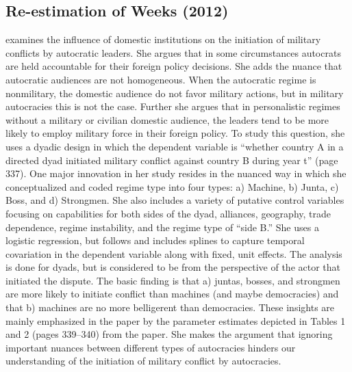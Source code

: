 \subsection{Re-estimation of Weeks (2012)}

\citet{weeks:2012} examines the influence of domestic institutions on the initiation of military conflicts by autocratic leaders.  She argues that in some circumstances autocrats are held accountable for their foreign policy decisions. She adds the nuance that autocratic audiences are not homogeneous. When the autocratic regime is nonmilitary, the domestic audience do not favor military actions, but in military autocracies this is not the case. Further she argues that in personalistic regimes without a military or civilian domestic audience, the leaders tend to be more likely to employ military force in their foreign policy.  To study this question, she uses a dyadic design in which the dependent variable is ``whether country A in a directed dyad initiated military conflict against country B during year t'' (page 337).  One major innovation in her study resides in the nuanced way in which she conceptualized and coded regime type into four types: a) Machine, b) Junta, c) Boss, and d) Strongmen. She also includes a variety of putative control variables focusing on capabilities for both sides of the dyad, alliances, geography, trade dependence, regime instability, and the regime type of ``side B.''  She uses a logistic regression, but follows \citet{beck:etal:1998} and includes splines to capture temporal covariation in the dependent variable along with fixed, unit effects. The analysis is done for dyads, but is considered to be from the perspective of the actor that initiated the dispute. The basic finding is that a) juntas, bosses, and strongmen are more likely to initiate conflict than machines (and maybe democracies) and that b) machines are no more belligerent than democracies.  These insights are mainly emphasized in the paper by the parameter estimates depicted in Tables 1 and 2 (pages 339--340) from the paper. She makes the argument that ignoring important nuances between different types of autocracies hinders our understanding of the initiation of military conflict by autocracies. 

